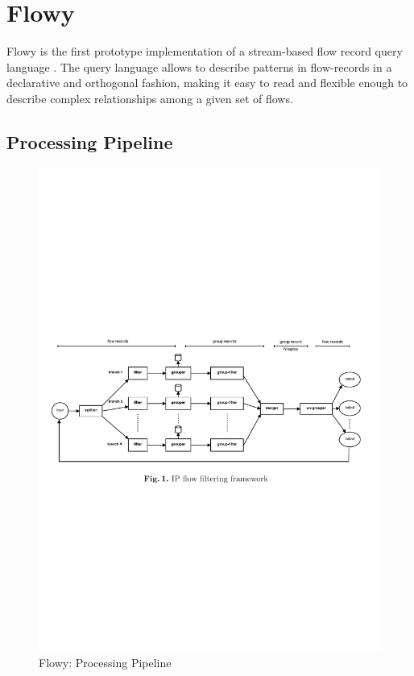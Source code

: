 \chapter{Flowy}\label{ch:flowy-design}

Flowy \cite{kkanev:thesis:2009}\cite{kkanev:2010} is the first prototype implementation of a stream-based flow record query language \cite{vmarinov:thesis:2009}\cite{vmarinov:2009}\cite{vmarinov:2008}. The query language allows to describe patterns in flow-records in a declarative and orthogonal fashion, making it easy to read and flexible enough to describe complex relationships among a given set of flows. 

\section{Processing Pipeline}\label{sec:processing-pipeline}

\begin{figure}[h!]	
\begin{center}
  \includegraphics* [width=1.0\linewidth]{figures/flowy-pipeline}	
  \caption{Flowy: Processing Pipeline \cite{vmarinov:2009}}
  \label{fig:flowy-pipeline}
\end{center}
\end{figure}

